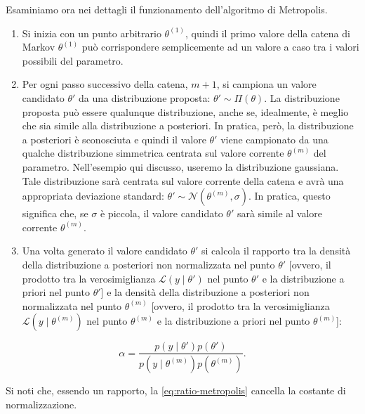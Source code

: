 \documentclass[
  11pt,
]{krantz}
\theoremstyle{definition}
\theoremstyle{definition}
\theoremstyle{definition}
\theoremstyle{definition}
\theoremstyle{remark}
\begin{document}
Esaminiamo ora nei dettagli il funzionamento dell'algoritmo di Metropolis.

\begin{enumerate}
\def\labelenumi{(\alph{enumi})}
\item
  Si inizia con un punto arbitrario \(\theta^{(1)}\), quindi il primo valore della catena di Markov \(\theta^{(1)}\) può corrispondere semplicemente ad un valore a caso tra i valori possibili del parametro.
\item
  Per ogni passo successivo della catena, \(m + 1\), si campiona un valore candidato \(\theta'\) da una distribuzione proposta: \(\theta' \sim \Pi(\theta)\). La distribuzione proposta può essere qualunque distribuzione, anche se, idealmente, è meglio che sia simile alla distribuzione a posteriori. In pratica, però, la distribuzione a posteriori è sconosciuta e quindi il valore \(\theta'\) viene campionato da una qualche distribuzione simmetrica centrata sul valore corrente \(\theta^{(m)}\) del parametro. Nell'esempio qui discusso, useremo la distribuzione gaussiana. Tale distribuzione sarà centrata sul valore corrente della catena e avrà una appropriata deviazione standard: \(\theta' \sim \mathcal{N}(\theta^{(m)}, \sigma)\). In pratica, questo significa che, se \(\sigma\) è piccola, il valore candidato \(\theta'\) sarà simile al valore corrente \(\theta^{(m)}\).
\item
  Una volta generato il valore candidato \(\theta'\) si calcola il rapporto tra la densità della distribuzione a posteriori non normalizzata nel punto \(\theta'\) {[}ovvero, il prodotto tra la verosimiglianza \(\mathcal{L}(y \mid \theta')\) nel punto \(\theta'\) e la distribuzione a priori nel punto \(\theta'\){]} e la densità della distribuzione a posteriori non normalizzata nel punto \(\theta^{(m)}\) {[}ovvero, il prodotto tra la verosimiglianza \(\mathcal{L}(y \mid \theta^{(m)})\) nel punto \(\theta^{(m)}\) e la distribuzione a priori nel punto \(\theta^{(m)}\){]}:
\end{enumerate}

\begin{equation}
\alpha = \frac{p(y \mid \theta') p(\theta')}{p(y \mid \theta^{(m)}) p(\theta^{(m)})}.
\label{eq:ratio-metropolis}
\end{equation}

Si noti che, essendo un rapporto, la \eqref{eq:ratio-metropolis} cancella la costante di normalizzazione.
\end{document}
